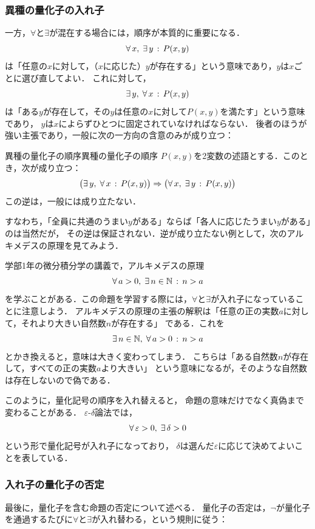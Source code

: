 \subsubsection{異種の量化子の入れ子}
 
一方，$\forall$と$\exists$が混在する場合には，順序が本質的に重要になる．
\[
  \forall\, x ,\; \exists\, y \,:\, P(x, y)
\]
は「任意の$x$に対して，（$x$に応じた）$y$が存在する」という意味であり，$y$は$x$ごとに選び直してよい．
これに対して，
\[
  \exists\, y ,\; \forall\, x \,:\, P(x, y)
\]
は「ある$y$が存在して，その$y$は任意の$x$に対して$P(x, y)$を満たす」という意味であり，
$y$は$x$によらずひとつに固定されていなければならない．
後者のほうが強い主張であり，一般に次の一方向の含意のみが成り立つ：
 
\begin{prop}{異種の量化子の順序}{異種の量化子の順序}
  $P(x, y)$を2変数の述語とする．このとき，次が成り立つ：
  \[
    \bigl( \exists\, y ,\; \forall\, x \,:\, P(x, y) \bigr)
    \mathrel{\Rightarrow}
    \bigl( \forall\, x ,\; \exists\, y \,:\, P(x, y) \bigr)
  \]
  この逆は，一般には成り立たない．
\end{prop}
 
すなわち，「全員に共通のうまい$y$がある」ならば「各人に応じたうまい$y$がある」のは当然だが，
その逆は保証されない．逆が成り立たない例として，次のアルキメデスの原理を見てみよう．
 
学部1年の微分積分学の講義で，アルキメデスの原理
\[
  \forall\, a>0 ,\; \exists\, n\in\mathbb{N} \,:\, n>a
\]
を学ぶことがある．この命題を学習する際には，$\forall$と$\exists$が入れ子になっていることに注意しよう．
アルキメデスの原理の主張の解釈は「任意の正の実数$a$に対して，それより大きい自然数$n$が存在する」
である．これを
\[
  \exists\, n\in\mathbb{N} ,\; \forall\, a>0 \,:\, n>a
\]
とかき換えると，意味は大きく変わってしまう．
こちらは「ある自然数$n$が存在して，すべての正の実数$a$より大きい」
という意味になるが，そのような自然数は存在しないので偽である．
 
このように，量化記号の順序を入れ替えると，
命題の意味だけでなく真偽まで変わることがある．
$\varepsilon$-$\delta$論法では，
\[
  \forall\, \varepsilon>0 ,\; \exists\, \delta>0
\]
という形で量化記号が入れ子になっており，
$\delta$は選んだ$\varepsilon$に応じて決めてよいことを表している．
 
\subsubsection{入れ子の量化子の否定}
 
最後に，量化子を含む命題の否定について述べる．
量化子の否定は，$\lnot$が量化子を通過するたびに$\forall$と$\exists$が入れ替わる，という規則に従う：
 
